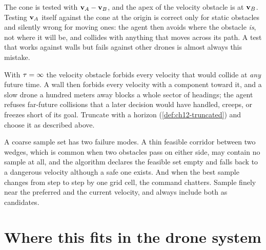\begin{pitfall}
The cone is tested with $\mathbf{v}_A - \mathbf{v}_B$, and the apex of the velocity
obstacle is at $\mathbf{v}_B$. Testing $\mathbf{v}_A$ itself against the cone at the
origin is correct only for static obstacles and silently wrong for moving
ones: the agent then avoids where the obstacle \emph{is}, not where it will
be, and collides with anything that moves across its path. A test that works
against walls but fails against other drones is almost always this
mistake.
\end{pitfall}

\begin{pitfall}[No truncation]
With $\tau = \infty$ the velocity obstacle forbids every velocity that would
collide at \emph{any} future time. A wall then forbids every velocity with a
component toward it, and a slow drone a hundred meters away blocks a whole
sector of headings; the agent refuses far-future collisions that a later
decision would have handled, creeps, or freezes short of its goal. Truncate
with a horizon (\cref{def:ch12-truncated}) and choose it as described above.
\end{pitfall}

\begin{pitfall}
A coarse sample set has two failure modes. A thin feasible corridor between
two wedges, which is common when two obstacles pass on either side, may
contain no sample at all, and the algorithm declares the feasible set empty
and falls back to a dangerous velocity although a safe one exists. And when
the best sample changes from step to step by one grid cell, the command
chatters. Sample finely near the preferred and the current velocity, and
always include both as candidates.
\end{pitfall}

\section{Where this fits in the drone system}
\label{sec:ch12-drone}

